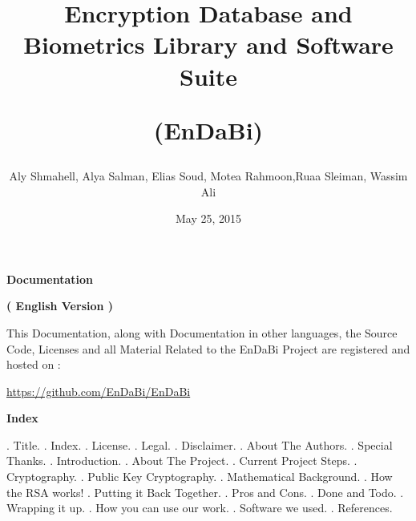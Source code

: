 \documentclass{slides}
\title{\Huge \begin{center} Encryption Database and Biometrics Library and Software Suite \end{center} \centering (EnDaBi)}
\author{Aly Shmahell, Alya Salman, Elias Soud, Motea Rahmoon,Ruaa Sleiman, Wassim Ali}
\date{May 25, 2015}
\begin{document}
\maketitle
\begin{center}
\textbf{\huge Documentation}
\end{center}
\begin{center}
\textbf{\Large ( English Version )}
\end{center}
\begin{center}
This Documentation, along with Documentation in other languages, the Source Code, Licenses and all Material Related to the EnDaBi Project are registered and hosted on :
\end{center}
\begin{center}
\url{https://github.com/EnDaBi/EnDaBi}
\end{center}
\newpage
\begin{center} 
\textbf{\Large Index}
\end{center}
 . Title.
\newline . Index.
\newline . License.
\newline . Legal.
\newline . Disclaimer.
\newline . About The Authors.
\newline . Special Thanks.
\newline . Introduction.
\newline . About The Project.
\newline . Current Project Steps.
\newline . Cryptography.
\newline . Public Key Cryptography.
\newline . Mathematical Background. 
\newline . How the RSA works!
\newline . Putting it Back Together.
\newline . Pros and Cons.
\newline . Done and Todo.
\newline . Wrapping it up.
\newline . How you can use our work.
\newline . Software we used.
\newline . References.
\end{document}
